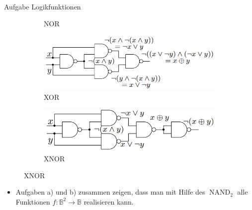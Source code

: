 \begin{frame}[allowframebreaks]{Aufgabe \thesection}{Logikfunktionen}
\begin{solutionnoinc}
\begin{figure}
\begin{subfigure}{0.3\linewidth}
        \caption{NOR}
      \end{subfigure}
      \begin{subfigure}{0.3\linewidth}
        \includegraphics[width=\linewidth, center]{./figures/xor.png}
        \caption{XOR}
      \end{subfigure}
      \begin{subfigure}{0.3\linewidth}
        \includegraphics[width=\linewidth, center]{./figures/xnor.png}
        \caption{XNOR}
      \end{subfigure}
    \end{figure}
  \end{solutionnoinc}
  \begin{Sidenote}
    \begin{itemize}
      \item Aufgaben a) und b) zusammen zeigen, dass man mit Hilfe des $\operatorname{NAND}_2$ alle Funktionen $f: \mathbb{B}^2 \rightarrow \mathbb{B}$ realisieren kann.
    \end{itemize}
  \end{Sidenote}
\end{frame}
